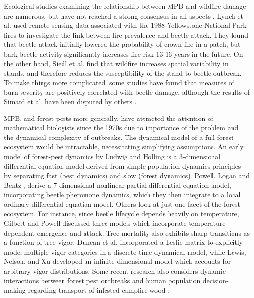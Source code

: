 Ecological studies examining the relationship between MPB and wildfire damage are numerous, but have not reached a strong consensus in all aspects \cite{axelson2009influence,lynch2006influence, simard2011mountain, bradley2001effects,kaufmann2008status,meigs2016insect,agne2016fire,seidl2016spatial,JENKINS200816}. Lynch et al. \cite{lynch2006influence} used remote sensing data associated with the 1988 Yellowstone National Park fires to investigate the link between fire prevalence and beetle attack. They found that beetle attack initially lowered the probability of crown fire in a patch, but bark beetle activity significantly increases fire risk 13-16 years in the future. On the other hand, Siedl et al. \cite{seidl2016spatial} find that wildfire increases spatial variability in stands, and therefore reduces the susceptibility of the stand to beetle outbreak. To make things more complicated, some studies have found that measures of burn severity are positively correlated with beetle damage\cite{simard2011mountain, bradley2001effects}, although the results of Simard et al. \cite{simard2011mountain} have been disputed by others \cite{moran2012mountain}.

MPB, and forest pests more generally, have attracted the attention of mathematical biologists since the 1970s due to importance of the problem and the dynamical complexity of outbreaks. The dynamical model of a full forest ecosystem would be intractable, necessitating simplifying assumptions. An early model of forest-pest dynamics by Ludwig and Holling \cite{ludwig1978qualitative} is a 3-dimensional differential equation model derived from simple population dynamics principles by separating fast (pest dynamics) and slow (forest dynamics). Powell, Logan  and Bentz \cite{powell1996local}, derive a 7-dimensional nonlinear partial differential equation model, incorporating beetle pheromone dynamics, which they then integrate to a local ordinary differential equation model. Others look at just one facet of the forest ecosystem. For instance, since beetle lifecycle depends heavily on temperature, Gilbert and Powell \cite{gilbert2004comparison} discussed three models which incorporate temperature-dependent emergence and attack. Tree mortality also exhibits sharp transitions as a function of tree vigor. Duncan et al.\cite{duncan2015model} incorporated a Leslie matrix to explicitly model multiple vigor categories in a discrete time dynamical model, while Lewis, Nelson, and Xu \cite{lewis2010structured} developed an infinite-dimensional model which accounts for arbitrary vigor distributions.  Some recent research also considers dynamic interactions between forest pest outbreaks and human population decision-making regarding transport of infested campfire wood \cite{barlow2014modelling, ali2015coupled}. 

